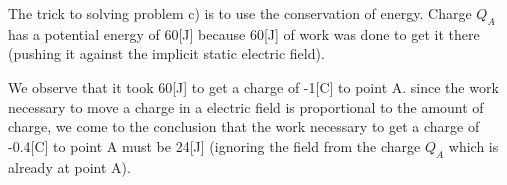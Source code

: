\documentclass[paper=a4, fontsize=11pt]{scrartcl} %
\numberwithin{equation}{section} %
\numberwithin{figure}{section} %
\numberwithin{table}{section} %
\begin{document}
The trick to solving problem c) is to use the conservation of energy. Charge $Q_A$ has a potential
energy of 60[J] because 60[J] of work was done to get it there (pushing it against the implicit static electric field).

We observe that it took 60[J] to get a charge of -1[C] to point A. since the work necessary to move a
charge in a electric field is proportional to the amount of charge, we come to the conclusion
that the work necessary to get a charge of -0.4[C] to point A must be 24[J] (ignoring the field from the charge $Q_A$ which is already at point A).
\end{document}
